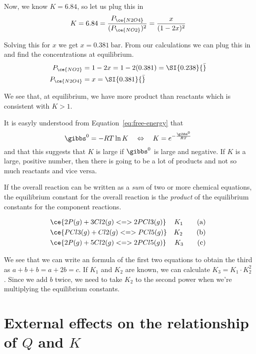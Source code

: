 \documentclass[../mit-general-chemistry.tex]{subfiles}
\begin{document}
Now, we know $K = 6.84$, so let us plug this in
\begin{equation*}
  K = 6.84 = \frac{P_{\ce{N2O4}}}{(P_{\ce{NO2}})^2}
  = \frac{x}{(1 - 2x)^2}
\end{equation*}

Solving this for $x$ we get $x = \SI{0.381}{\bar}$. From our
calculations we can plug this in and find the concentrations at
equilibrium.
\begin{align*}
  P_{\ce{NO2}} &= 1 - 2x = 1 - 2(0.381) = \SI{0.238}{\bar} \\
  P_{\ce{N2O4}} &= x = \SI{0.381}{\bar} \\
\end{align*}


We see that, at equilibrium, we have more product than reactants which
is consistent with $K > 1$.


It is easyly understood from  Equation~\ref{eq:free-energy} that
\begin{equation}
  \gibbs^0 = -RT \ln K \quad\Leftrightarrow\quad K = e^{ - \frac{\gibbs^0}{RT}}
\end{equation}
and that this suggests that $K$ is large if $\gibbs^0$ is large and
negative. If $K$ is a large, positive number, then there is going to
be a lot of products and not so much reactants and vice versa.




If the overall reaction can be written as a {\em sum} of two or more
chemical equations, the equilibrium constant for the overall reaction
is the {\em product} of the equilibrium constants for the component
reactions.


\begin{align*}
  &\ce{2P(g) + 3Cl2(g) <=> 2PCl3(g)} &K_1 \tag{a}\\
  &\ce{PCl3(g) + Cl2(g) <=> PCl5(g)} &K_2 \tag{b}\\
  &\ce{2P(g) + 5Cl2(g) <=> 2PCl5(g)} &K_3 \tag{c}\\
\end{align*}


We see that we can write an formula of the first two equations to
obtain the third as $a + b + b = a + 2b = c$. If $K_1$ and $K_2$ are
known, we can calculate $K_3 = K_1 \cdot K_2^2$. Since we add $b$
twice, we need to take $K_2$ to the second power when we're
multiplying the equilibrium constants.




\section{External effects on the relationship of $Q$ and $K$}
\end{document}
